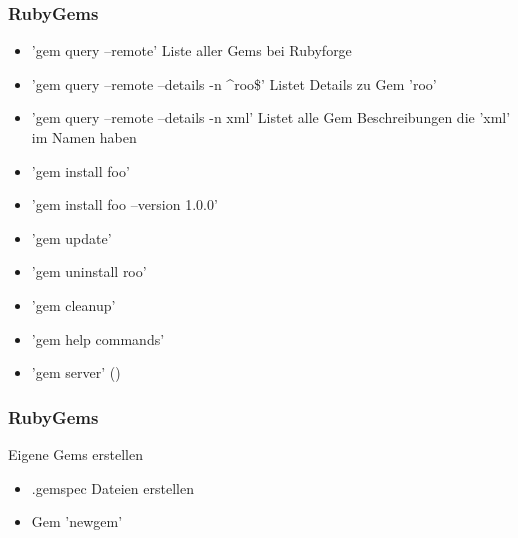 \begin{frame}
  \frametitle{RubyGems}
  \begin{itemize}
  
    \item 'gem query --remote' Liste aller Gems bei Rubyforge
    \item 'gem query --remote --details -n ^roo\$' Listet Details zu Gem 'roo' 
    \item 'gem query --remote --details -n xml' Listet alle Gem Beschreibungen die 'xml' im Namen haben
    \item 'gem install foo'
    \item 'gem install foo --version 1.0.0'
    \item 'gem update'
    \item 'gem uninstall roo'
    \item 'gem cleanup'
    \item 'gem help commands'
    \item 'gem server' ()
  \end{itemize}
\end{frame}

\begin{frame}
  \frametitle{RubyGems}
  Eigene Gems erstellen
  \begin{itemize}
    \item .gemspec Dateien erstellen
    \item Gem 'newgem'
  \end{itemize}
\end{frame}
